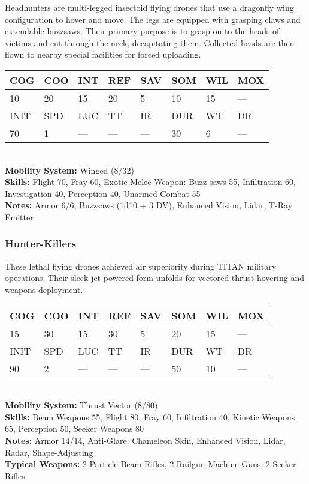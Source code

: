Headhunters are multi-legged insectoid flying drones that use a dragonfly wing configuration to hover and move. The legs are equipped with grasping claws and extendable buzzsaws. Their primary purpose is to grasp on to the heads of victims and cut through the neck, decapitating them. Collected heads are then flown to nearby special facilities for forced uploading. \\ \begin{tabular}{|l|l|l|l|l|l|l|l|} \hline

COG &COO &INT &REF &SAV &SOM &WIL &MOX \\ \hline

10 &20 &15 &20 &5 &10 &15 &— \\ \hline

INIT &SPD &LUC &TT &IR &DUR &WT &DR \\ \hline

70 &1 &— &— &— &30 &6 &— \\ \hline

\end{tabular} \\ \textbf{Mobility System: }Winged (8/32) \\ \textbf{Skills:} Flight 70, Fray 60, Exotic Melee Weapon: Buzz-saws 55, Infiltration 60, Investigation 40, Perception 40, Unarmed Combat 55 \\ \textbf{Notes:} Armor 6/6, Buzzsaws (1d10 + 3 DV), Enhanced Vision, Lidar, T-Ray Emitter 

\subsubsection{Hunter-Killers} 

These lethal flying drones achieved air superiority during TITAN military operations. Their sleek jet-powered form unfolds for vectored-thrust hovering and weapons deployment. \\ \begin{tabular}{|l|l|l|l|l|l|l|l|} \hline

COG &COO &INT &REF &SAV &SOM &WIL &MOX \\ \hline

15 &30 &15 &30 &5 &20 &15 &— \\ \hline

INIT &SPD &LUC &TT &IR &DUR &WT &DR \\ \hline

90 &2 &— &— &— &50 &10 &— \\ \hline

\end{tabular} \\ \textbf{Mobility System: }Thrust Vector (8/80) \\ \textbf{Skills:} Beam Weapons 55, Flight 80, Fray 60, Infiltration 40, Kinetic Weapons 65, Perception 50, Seeker Weapons 80 \\ \textbf{Notes:} Armor 14/14, Anti-Glare, Chameleon Skin, Enhanced Vision, Lidar, Radar, Shape-Adjusting \\ \textbf{Typical Weapons:} 2 Particle Beam Rifles, 2 Railgun Machine Guns, 2 Seeker Rifles 

